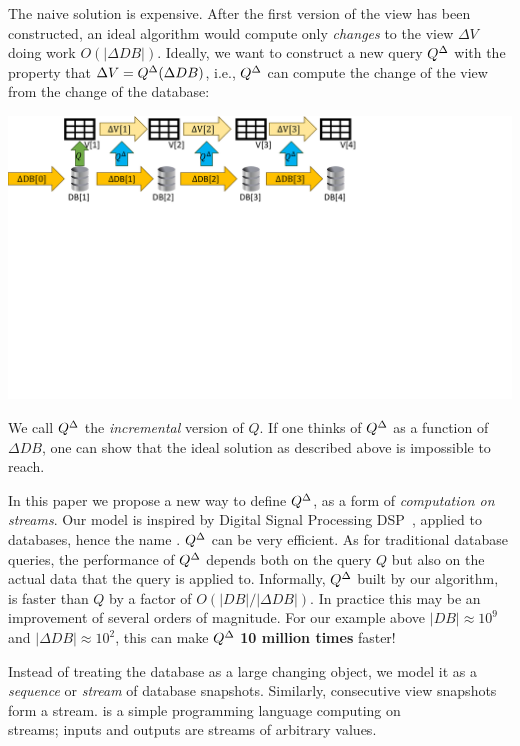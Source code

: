 The naive solution is expensive.  After the first version of the view
has been constructed, an ideal algorithm would compute only
\emph{changes} to the view $\Delta V$ doing work $O(|\Delta DB|)$.
Ideally, we want to construct a new query ${Q}^{\Delta}$ with the property
that $\Delta V = {Q}^{\Delta}(\Delta DB)$, i.e., ${Q}^{\Delta}$ can compute the
change of the view from the change of the database:

\includegraphics[trim={0 5.2in 4.1in 0},clip,scale=.30]{incview.pdf}

We call ${Q}^{\Delta}$ the \emph{incremental} version of $Q$.  If one
thinks of ${Q}^{\Delta}$ as a function of $\Delta DB$, one can show that
the ideal solution as described above is impossible to reach.

In this paper we propose a new way to define ${Q}^{\Delta}$, as a form of
\emph{computation on streams}.  Our model is inspired by Digital
Signal Processing DSP~\cite{rabiner-book75}, applied to databases,
hence the name \dbsp.  ${Q}^{\Delta}$ can be very efficient.  As for
traditional database queries, the performance of ${Q}^{\Delta}$ depends
both on the query $Q$ but also on the actual data that the query is
applied to.  Informally, ${Q}^{\Delta}$ built by our algorithm, is faster
than $Q$ by a factor of $O(|DB| / |\Delta DB|)$.  In practice this may
be an improvement of several orders of magnitude.  For our example
above $|DB| \approx 10^9$ and $|\Delta DB| \approx 10^2$, this can
make ${Q}^{\Delta}$ \textbf{10 million times} faster!

Instead of treating the database as a large changing object, we model
it as a \emph{sequence} or \emph{stream} of database snapshots.
Similarly, consecutive view snapshots form a stream.  \dbsp is a
simple programming language computing on \\streams; inputs and outputs
are streams of arbitrary values.

